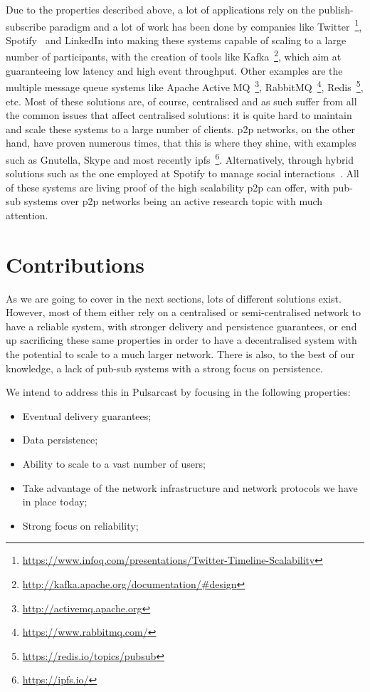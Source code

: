 Due to the properties described above, a lot of applications rely on the
publish-subscribe paradigm and a lot of work has been done by companies like
Twitter~\footnote{\url{https://www.infoq.com/presentations/Twitter-Timeline-Scalability}},
Spotify~\cite{Setty2013} and LinkedIn into making these systems capable of
scaling to a large number of participants, with the creation of tools like
Kafka~\footnote{\url{http://kafka.apache.org/documentation/\#design}}, which
aim at guaranteeing low latency and high event throughput. Other examples are
the multiple message queue systems like Apache Active
MQ~\footnote{\url{http://activemq.apache.org}},
RabbitMQ~\footnote{\url{https://www.rabbitmq.com/}},
Redis~\footnote{\url{https://redis.io/topics/pubsub}}, etc. Most of these
solutions are, of course, centralised and as such suffer from all the common
issues that affect centralised solutions: it is quite hard to maintain and
scale these systems to a large number of clients. \acrfull{p2p} networks, on
the other hand, have proven numerous times, that this is where they shine, with
examples such as Gnutella, Skype and most recently
\acrshort{ipfs}~\footnote{\url{https://ipfs.io/}}. Alternatively, through
hybrid solutions such as the one employed at Spotify to manage social
interactions~\cite{Setty2013}. All of these systems are living proof of the
high scalability \acrshort{p2p} can offer, with pub-sub systems over
\acrshort{p2p} networks being an active research topic with much attention.

\section{Contributions}

As we are going to cover in the next sections, lots of different solutions
exist. However, most of them either rely on a centralised or semi-centralised
network to have a reliable system, with stronger delivery and persistence
guarantees, or end up sacrificing these same properties in order to have a
decentralised system with the potential to scale to a much larger network.
There is also, to the best of our knowledge, a lack of pub-sub systems with a
strong focus on persistence.

We intend to address this in Pulsarcast by focusing in the following
properties:

\begin{itemize}
  \item
    Eventual delivery guarantees;
  \item
    Data persistence;
  \item
    Ability to scale to a vast number of users;
  \item
    Take advantage of the network infrastructure and network protocols we have in place today;
  \item
    Strong focus on reliability;
\end{itemize}

